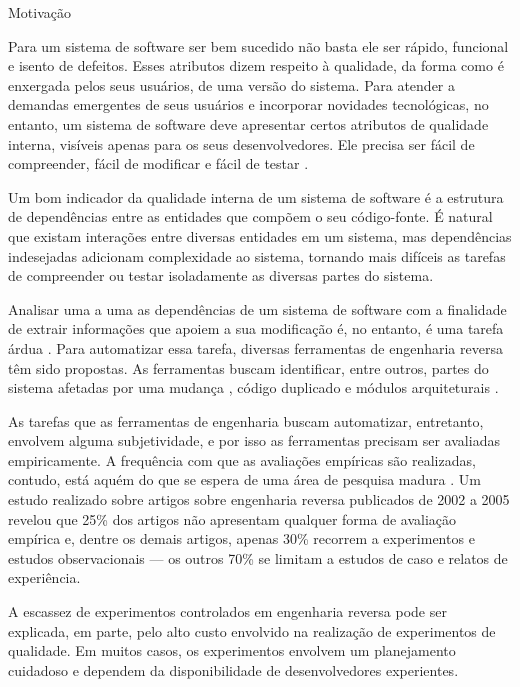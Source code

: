 \begin{section}{Motivação}

		Para um sistema de software ser bem sucedido não basta ele ser rápido, funcional e isento de defeitos. Esses atributos dizem respeito à qualidade, da forma como é enxergada pelos seus usuários, de uma versão do sistema. Para atender a demandas emergentes de seus usuários e incorporar novidades tecnológicas, no entanto, um sistema de software deve apresentar certos atributos de qualidade interna, visíveis apenas para os seus desenvolvedores. Ele precisa ser fácil de compreender, fácil de modificar e fácil de testar \cite{Parnas1994}.

		Um bom indicador da qualidade interna de um sistema de software é a estrutura de dependências entre as entidades que compõem o seu código-fonte. É natural que existam interações entre diversas entidades em um sistema, mas dependências indesejadas adicionam complexidade ao sistema, tornando mais difíceis as tarefas de compreender ou testar isoladamente as diversas partes do sistema.

		Analisar uma a uma as dependências de um sistema de software com a finalidade de extrair informações que apoiem a sua modificação é, no entanto, é uma tarefa árdua \cite{Tonella2007}. Para automatizar essa tarefa, diversas ferramentas de engenharia reversa têm sido propostas. As ferramentas buscam identificar, entre outros, partes do sistema afetadas por uma mudança \cite{Arnold1993}, código duplicado \cite{Roy2007} e módulos arquiteturais \cite{Maqbool2007}.

	As tarefas que as ferramentas de engenharia buscam automatizar, entretanto, envolvem alguma subjetividade, e por isso as ferramentas precisam ser avaliadas empiricamente. A frequência com que as avaliações empíricas são realizadas, contudo, está aquém do que se espera de uma área de pesquisa madura \cite{Tonella2007}. Um estudo realizado sobre artigos sobre engenharia reversa publicados de 2002 a 2005 revelou que 25\% dos artigos não apresentam qualquer forma de avaliação empírica e, dentre os demais artigos, apenas 30\% recorrem a experimentos e estudos observacionais --- os outros 70\% se limitam a estudos de caso e relatos de experiência.

		A escassez de experimentos controlados em engenharia reversa pode ser explicada, em parte, pelo alto custo envolvido na realização de experimentos de qualidade. Em muitos casos, os experimentos envolvem um planejamento cuidadoso e dependem da disponibilidade de desenvolvedores experientes.


\end{section}
